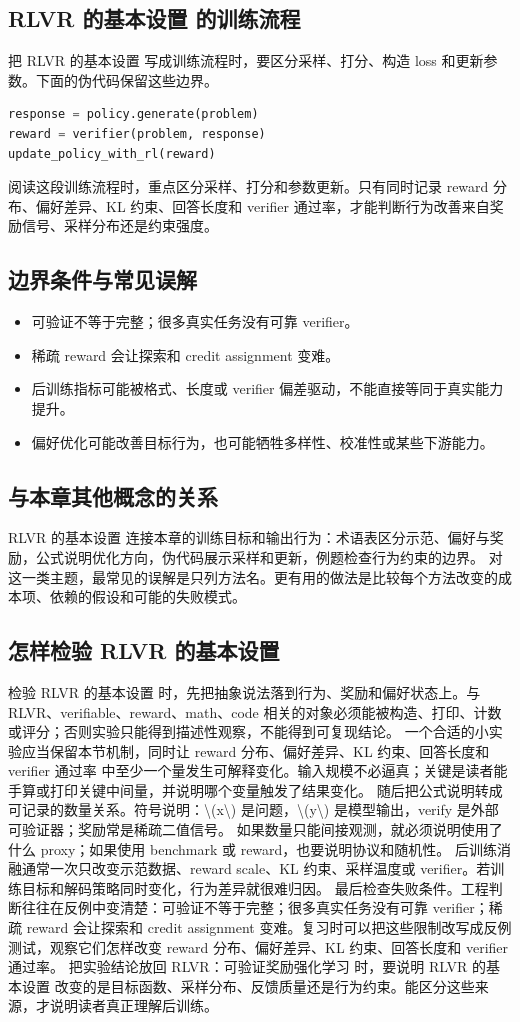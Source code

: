 \documentclass[a4paper]{article}
\begin{document}
\subsection{RLVR 的基本设置 的训练流程}
把 RLVR 的基本设置 写成训练流程时，要区分采样、打分、构造 loss 和更新参数。下面的伪代码保留这些边界。
\begin{lstlisting}[language=Python]
response = policy.generate(problem)
reward = verifier(problem, response)
update_policy_with_rl(reward)
\end{lstlisting}
阅读这段训练流程时，重点区分采样、打分和参数更新。只有同时记录 reward 分布、偏好差异、KL 约束、回答长度和 verifier 通过率，才能判断行为改善来自奖励信号、采样分布还是约束强度。
\subsection{边界条件与常见误解}
\begin{itemize}
\item 可验证不等于完整；很多真实任务没有可靠 verifier。
\item 稀疏 reward 会让探索和 credit assignment 变难。
\item 后训练指标可能被格式、长度或 verifier 偏差驱动，不能直接等同于真实能力提升。
\item 偏好优化可能改善目标行为，也可能牺牲多样性、校准性或某些下游能力。
\end{itemize}
\subsection{与本章其他概念的关系}
RLVR 的基本设置 连接本章的训练目标和输出行为：术语表区分示范、偏好与奖励，公式说明优化方向，伪代码展示采样和更新，例题检查行为约束的边界。
对这一类主题，最常见的误解是只列方法名。更有用的做法是比较每个方法改变的成本项、依赖的假设和可能的失败模式。
\subsection{怎样检验 RLVR 的基本设置}
检验 RLVR 的基本设置 时，先把抽象说法落到行为、奖励和偏好状态上。与 RLVR、verifiable、reward、math、code 相关的对象必须能被构造、打印、计数或评分；否则实验只能得到描述性观察，不能得到可复现结论。
一个合适的小实验应当保留本节机制，同时让 reward 分布、偏好差异、KL 约束、回答长度和 verifier 通过率 中至少一个量发生可解释变化。输入规模不必逼真；关键是读者能手算或打印关键中间量，并说明哪个变量触发了结果变化。
随后把公式说明转成可记录的数量关系。符号说明：\textbackslash{}(x\textbackslash{}) 是问题，\textbackslash{}(y\textbackslash{}) 是模型输出，verify 是外部可验证器；奖励常是稀疏二值信号。 如果数量只能间接观测，就必须说明使用了什么 proxy；如果使用 benchmark 或 reward，也要说明协议和随机性。
后训练消融通常一次只改变示范数据、reward scale、KL 约束、采样温度或 verifier。若训练目标和解码策略同时变化，行为差异就很难归因。
最后检查失败条件。工程判断往往在反例中变清楚：可验证不等于完整；很多真实任务没有可靠 verifier；稀疏 reward 会让探索和 credit assignment 变难。复习时可以把这些限制改写成反例测试，观察它们怎样改变 reward 分布、偏好差异、KL 约束、回答长度和 verifier 通过率。
把实验结论放回 RLVR：可验证奖励强化学习 时，要说明 RLVR 的基本设置 改变的是目标函数、采样分布、反馈质量还是行为约束。能区分这些来源，才说明读者真正理解后训练。
\end{document}
